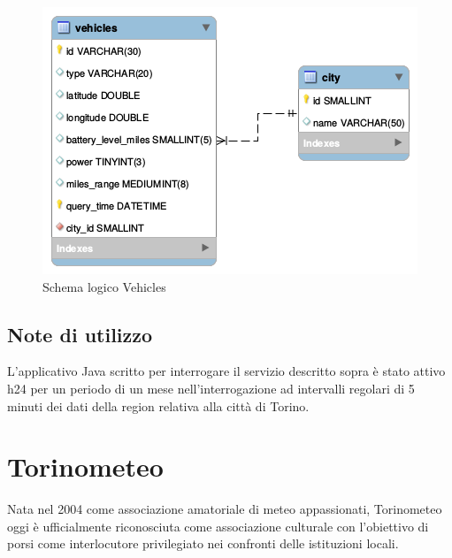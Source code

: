 \begin{figure}[H]                                                                                                                                                            
\centering                                                                                                                                                                   
\includegraphics[width=\textwidth]{diagrams/vehicles_logic}                                                                                                                                   
\caption{Schema logico Vehicles}                                                                                                                                            
\label{fig:vehicles_logic_physic}                                                                                                                                                           
\end{figure}

\subsection{Note di utilizzo}

L'applicativo Java scritto per interrogare il servizio descritto sopra è stato attivo h24
per un periodo di un mese nell'interrogazione ad intervalli regolari di 5 minuti dei dati
della region relativa alla città di Torino.

\section{Torinometeo}
Nata nel 2004 come associazione amatoriale di meteo appassionati, Torinometeo oggi è ufficialmente
riconosciuta come associazione culturale con l'obiettivo di porsi come interlocutore privilegiato
nei confronti delle istituzioni locali.

